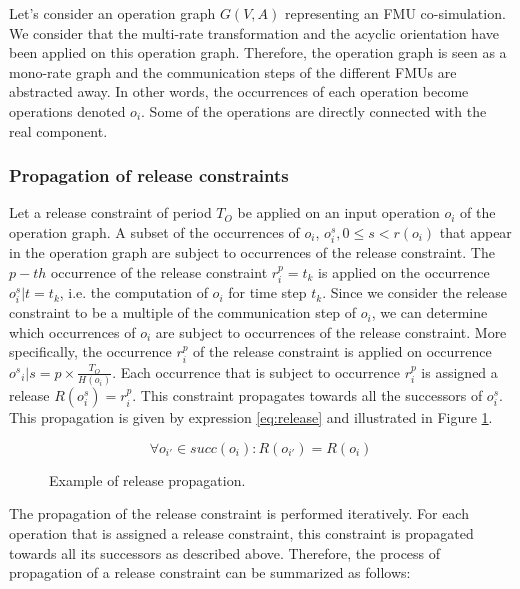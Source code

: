 Let's consider an operation graph $G(V,A)$ representing an FMU co-simulation. We consider that the multi-rate transformation and the acyclic orientation have been applied on this operation graph. Therefore, the operation graph is seen as a mono-rate graph and the communication steps of the different FMUs are abstracted away. In other words, the occurrences of each operation become operations denoted $o_i$. Some of the operations are directly connected with the real component.

\subsubsection{Propagation of release constraints}

Let a release constraint of period $T_O$ be applied on an input operation $o_i$ of the operation graph. A subset of the occurrences of $o_i$, $o^s_i, 0 \leq s < r(o_i)$ that appear in the operation graph are subject to occurrences of the release constraint. The $p-th$ occurrence of the release constraint $r_i^p = t_k$ is applied on the occurrence $o^s_i | t = t_k$, i.e. the computation of $o_i$ for time step $t_k$. Since we consider the release constraint to be a multiple of the communication step of ${o_i}$, we can determine which occurrences of $o_i$ are subject to occurrences of the release constraint. More specifically, the occurrence $r_i^p$ of the release constraint is applied on occurrence ${o^s}_i | s = p \times \frac{T_O}{H(o_i)}$. Each occurrence that is subject to occurrence $r_i^p$ is assigned a release $R(o^s_i) = r_i^p$. This constraint propagates towards all the successors of $o^s_i$. This propagation is given by expression \ref{eq:release} and illustrated in Figure \ref{fig:rpropagation}.

\begin{equation}
\forall o_{i'} \in succ(o_i): R(o_{i'}) = R(o_i)
\label{eq:release}
\end{equation}

\begin{figure}[phbt]
\centering

\caption{Example of release propagation.}
\label{fig:rpropagation}
\end{figure}

The propagation of the release constraint is performed iteratively. For each operation that is assigned a release constraint, this constraint is propagated towards all its successors as described above. Therefore, the process of propagation of a release constraint can be summarized as follows:

